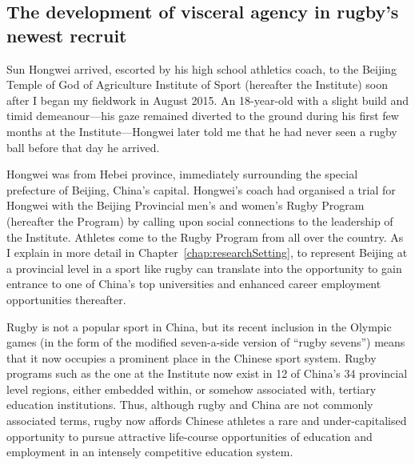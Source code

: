                                   \begin{CJK}{UTF8}{gbsn}

\section{The development of visceral agency in rugby's newest recruit\label{sect:SHW}}
Sun Hongwei arrived, escorted by his high school athletics coach, to the Beijing Temple of God of Agriculture Institute of Sport (hereafter the Institute) soon after I began my fieldwork in August 2015.  An 18-year-old with a slight build and timid demeanour---his gaze remained diverted to the ground during his first few months at the Institute---Hongwei later told me that he had never seen a rugby ball before that day he arrived.

Hongwei was from Hebei province, immediately surrounding the special prefecture of Beijing, China's capital.  Hongwei's coach had organised a trial for Hongwei with the Beijing Provincial men's and women's Rugby Program (hereafter the Program) by calling upon social connections to the leadership of the Institute.  Athletes come to the Rugby Program from all over the country.  As I explain in more detail in Chapter~\ref{chap:researchSetting}, to represent Beijing at a provincial level in a sport like rugby can translate into the opportunity to gain entrance to one of China's top universities and enhanced career employment opportunities thereafter.

Rugby is not a popular sport in China, but its recent inclusion in the Olympic games (in the form of the modified seven-a-side version of ``rugby sevens'') means that it now occupies a prominent place in the Chinese sport system.  Rugby programs such as the one at the Institute now exist in 12 of China's 34 provincial level regions, either embedded within, or somehow associated with, tertiary education institutions.  Thus, although rugby and China are not commonly associated terms, rugby now affords Chinese athletes a rare and under-capitalised opportunity to pursue attractive life-course opportunities of education and employment in an intensely competitive education system.


\end{CJK}
